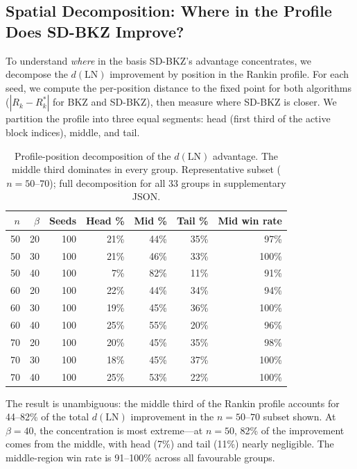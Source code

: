\documentclass[journal=cic,version=preprint]{iacrj}
\begin{document}
\subsection{Spatial Decomposition: Where in the Profile Does SD-BKZ Improve?}
\label{sec:spatial}

To understand \emph{where} in the basis SD-BKZ's advantage concentrates, we decompose the $d(\mathrm{LN})$ improvement by position in the Rankin profile. For each seed, we compute the per-position distance to the fixed point for both algorithms ($|R_k - R^*_k|$ for BKZ and SD-BKZ), then measure where SD-BKZ is closer. We partition the profile into three equal segments: head (first third of the active block indices), middle, and tail.

\begin{table}[tbp]
\centering
\caption{Profile-position decomposition of the $d(\mathrm{LN})$ advantage. The middle third dominates in every group. Representative subset ($n=50$--$70$); full decomposition for all 33 groups in supplementary JSON.\label{tab:spatial}}
\small
\begin{tabular}{rrrrrrr}
\hline
$n$ & $\beta$ & Seeds & Head \% & Mid \% & Tail \% & Mid win rate \\
\hline
50 & 20 & 100 & 21\% & 44\% & 35\% & 97\% \\
50 & 30 & 100 & 21\% & 46\% & 33\% & 100\% \\
50 & 40 & 100 & 7\%  & 82\% & 11\% & 91\% \\
60 & 20 & 100 & 22\% & 44\% & 34\% & 94\% \\
60 & 30 & 100 & 19\% & 45\% & 36\% & 100\% \\
60 & 40 & 100 & 25\% & 55\% & 20\% & 96\% \\
70 & 20 & 100 & 20\% & 45\% & 35\% & 98\% \\
70 & 30 & 100 & 18\% & 45\% & 37\% & 100\% \\
70 & 40 & 100 & 25\% & 53\% & 22\% & 100\% \\
\hline
\end{tabular}
\end{table}

The result is unambiguous: the middle third of the Rankin profile accounts for 44--82\% of the total $d(\mathrm{LN})$ improvement in the $n=50$--$70$ subset shown. At $\beta=40$, the concentration is most extreme---at $n=50$, 82\% of the improvement comes from the middle, with head (7\%) and tail (11\%) nearly negligible. The middle-region win rate is 91--100\% across all favourable groups.
\end{document}
